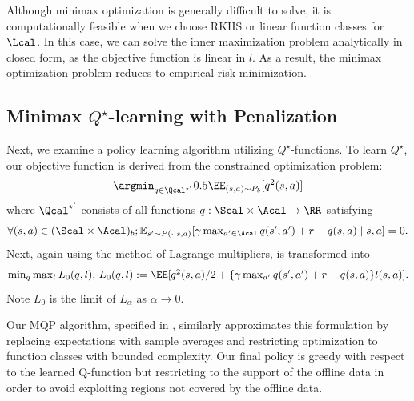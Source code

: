 \begin{remark}[Computation]
Although minimax optimization is generally difficult to solve, it is computationally feasible when we choose RKHS or linear function classes for $\Lcal$. In this case, we can solve the inner maximization problem analytically in closed form, as the objective function is linear in $l$. 
As a result, the minimax optimization problem reduces to  empirical risk minimization. 
\end{remark}






\subsection{Minimax $Q^{\star}$-learning with Penalization }


Next, we examine a policy learning algorithm utilizing $Q^{\star}$-functions. To learn $Q^{\star}$, our objective function is derived from the constrained optimization problem:
\begin{align}\textstyle\label{eq:goal2-pre}
    \argmin_{q\in \Qcal^{\star '}}0.5\EE_{(s,a)\sim P_b}[q^2(s,a)]
\end{align}
where $\Qcal^{\star '}$ consists of all functions $q: \Scal \times \Acal \to \RR$ satisfying
\begin{align*}\textstyle
\forall (s,a)\in (\Scal \times \Acal)_b;\mathbb{E}_{s'\sim P(\cdot \mid s,a)}[\gamma \max_{a'\in \Acal} q(s',a')+r-q(s,a)\mid s,a]=0. 
\end{align*}
Next, again using the method of Lagrange multipliers,  is transformed into 
\begin{align} \label{eq:goal2}\textstyle
    \min_{q}\max_{l} L_{0}(q,l),\,L_{0}(q,l):=\EE [q^2(s,a)/2 + \{ \gamma \max_{a'}q(s',a')+r-q(s,a)\}l(s,a)]. 
\end{align}
Note $L_0$ is the limit of $L_\alpha$ as $\alpha\to0$.

Our MQP algorithm, specified in , similarly approximates this formulation by replacing expectations with sample averages and restricting optimization to function classes with bounded complexity. Our final policy is greedy with respect to the learned Q-function but restricting to the support of the offline data in order to avoid exploiting regions not covered by the offline data.





